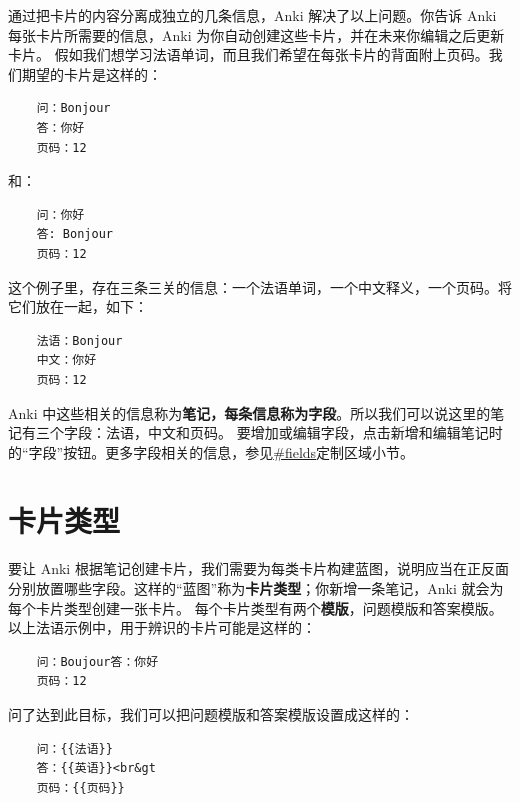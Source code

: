 \documentclass[a4paper]{book}
\begin{document}
通过把卡片的内容分离成独立的几条信息，Anki 解决了以上问题。你告诉 Anki 每张卡片所需要的信息，Anki 为你自动创建这些卡片，并在未来你编辑之后更新卡片。
假如我们想学习法语单词，而且我们希望在每张卡片的背面附上页码。我们期望的卡片是这样的：

\begin{shaded}\begin{verbatim}
	问：Bonjour
	答：你好
	页码：12
	\end{verbatim}\end{shaded}

和：
\begin{shaded}\begin{verbatim}
	问：你好
	答: Bonjour
	页码：12
	\end{verbatim}\end{shaded}

这个例子里，存在三条三关的信息：一个法语单词，一个中文释义，一个页码。将它们放在一起，如下：

\begin{shaded}\begin{verbatim}
	法语：Bonjour
	中文：你好
	页码：12
	\end{verbatim}\end{shaded}

Anki 中这些相关的信息称为\textbf{笔记，每条信息称为字段}。所以我们可以说这里的笔记有三个字段：法语，中文和页码。
要增加或编辑字段，点击新增和编辑笔记时的“字段”按钮。更多字段相关的信息，参见\url{#fields}定制区域小节。

\section{卡片类型}

要让 Anki 根据笔记创建卡片，我们需要为每类卡片构建蓝图，说明应当在正反面分别放置哪些字段。这样的“蓝图”称为\textbf{卡片类型}；你新增一条笔记，Anki 就会为每个卡片类型创建一张卡片。
每个卡片类型有两个\textbf{模版}，问题模版和答案模版。以上法语示例中，用于辨识的卡片可能是这样的：

\begin{shaded}\begin{verbatim}
	问：Boujour答：你好
	页码：12
	\end{verbatim}\end{shaded}

问了达到此目标，我们可以把问题模版和答案模版设置成这样的：

\begin{shaded}\begin{verbatim}
	问：{{法语}}
	答：{{英语}}<br&gt
	页码：{{页码}}
	\end{verbatim}\end{shaded}
\end{document}
